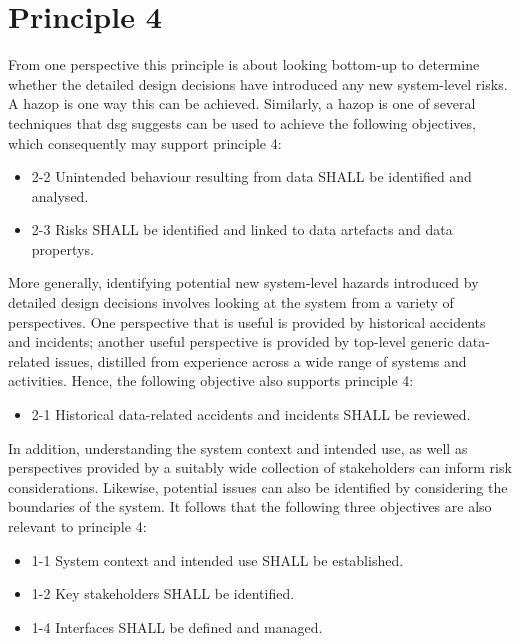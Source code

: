 \section{Principle 4}

From one perspective this principle is about looking bottom-up to determine whether the detailed design decisions have introduced any new system-level risks. A \gls{hazop} is one way this can be achieved. Similarly, a \gls{hazop} is one of several techniques that \gls{dsg} suggests can be used to achieve the following objectives, which consequently may support principle 4:

\begin{itemize}
	\item \textcolor{dsiwgAccentColour}{2-2} Unintended behaviour resulting from data SHALL be identified and analysed.
	\item \textcolor{dsiwgAccentColour}{2-3} Risks SHALL be identified and linked to \glspl{data artefact} and \glspl{data property}.
\end{itemize}

More generally, identifying potential new system-level hazards introduced by detailed design decisions involves looking at the system from a variety of perspectives. One perspective that is useful is provided by historical accidents and incidents; another useful perspective is provided by top-level generic data-related issues, distilled from experience across a wide range of systems and activities. Hence, the following objective also supports principle 4:

\begin{itemize}
	\item \textcolor{dsiwgAccentColour}{2-1} Historical data-related accidents and incidents SHALL be reviewed.
\end{itemize}

In addition, understanding the system context and intended use, as well as perspectives provided by a suitably wide collection of \glspl{stakeholder} can inform risk considerations. Likewise, potential issues can also be identified by considering the boundaries of the system. It follows that the following three objectives are also relevant to principle 4:

\begin{itemize}
	\item \textcolor{dsiwgAccentColour}{1-1} System context and intended use SHALL be established.
	\item \textcolor{dsiwgAccentColour}{1-2} Key \glspl{stakeholder} SHALL be identified.
	\item \textcolor{dsiwgAccentColour}{1-4} Interfaces SHALL be defined and managed.
\end{itemize}


